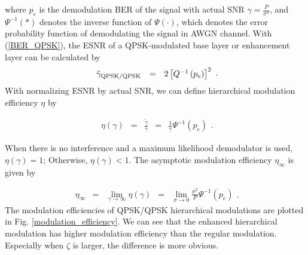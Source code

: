 \documentclass[10pt,fleqn, twocolumn]{IEEEtran}
\begin{document}
\noindent where $p_{e}$ is the demodulation BER of the signal with
actual SNR $\gamma=\frac{P}{\sigma^2}$, and
$\Psi^{-1}\left(\ast\right)$ denotes the inverse function of
$\Psi\left(\cdot\right)$, which denotes the error probability
function of demodulating the signal in AWGN channel. With
(\ref{BER_QPSK}), the ESNR of a QPSK-modulated base layer or
enhancement layer can be calculated by
\begin{equation}
\begin{array}{rcl}
\tilde{\gamma}_{\rm
QPSK/QPSK}&=&2\left[Q^{-1}\left(p_{e}\right)\right]^2
\end{array}.\label{eff_SNR_QPSK}
\end{equation}
\noindent With normalizing ESNR by actual SNR, we can define
hierarchical modulation efficiency $\eta$ by

\begin{equation}
\begin{array}{rcccl}
\eta\left(\gamma\right)&=&\frac{\tilde{\gamma}}{\gamma}&=&\frac{1}{\gamma}\Psi^{-1}\left(p_{e}\right)
\end{array}.\label{mod_eff}
\end{equation}

\noindent When there is no interference and a maximum likelihood
demodulator is used, $\eta\left(\gamma\right)=1$; Otherwise,
$\eta\left(\gamma\right)<1$.  The asymptotic modulation efficiency
$\eta_{\infty}$ is given by

\begin{equation}
\begin{array}{rcccl}
\eta_{\infty}&=&\lim\limits_{\gamma\rightarrow\infty}\eta\left(\gamma\right)&=&\lim\limits_{\sigma\rightarrow0}\frac{\sigma^2}{P}\Psi^{-1}\left(p_{e}\right)
\end{array}.\label{asy_mod_eff}
\end{equation}
\noindent The modulation efficiencies of QPSK/QPSK hierarchical
modulations are plotted in Fig. \ref{modulation_efficiency}. We
can see that the enhanced hierarchical modulation has higher
modulation efficiency than the regular modulation. Especially when
$\zeta$ is larger, the difference is more obvious.

\begin{figure}
\end{figure}
\end{document}
